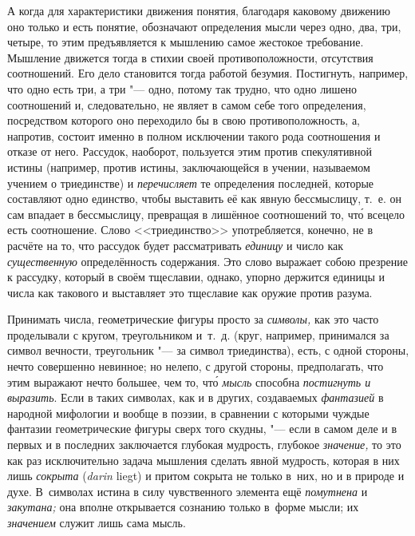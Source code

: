 А когда для характеристики движения понятия, благодаря каковому движению оно
только и есть понятие, обозначают определения мысли через одно, два, три,
четыре, то этим предъявляется к мышлению самое жестокое требование. Мышление
движется тогда в стихии своей противоположности, отсутствия соотношений. Его
дело становится тогда работой безумия. Постигнуть, например, что одно есть три,
а три "--- одно, потому так трудно, что одно лишено соотношений и,
следовательно, не являет в самом себе того определения, посредством которого
оно переходило бы в свою противоположность, а, напротив, состоит именно в
полном исключении такого рода соотношения и отказе от него. Рассудок, наоборот,
пользуется этим против спекулятивной истины (например, против истины,
заключающейся в учении, называемом учением о триединстве) и {\em перечисляет}
те определения последней, которые составляют одно единство, чтобы выставить её
как явную бессмыслицу, т.~е. он сам впадает в бессмыслицу, превращая в лишённое
соотношений то, чт\'{о} всецело есть соотношение. Слово <<триединство>>
употребляется, конечно, не в расчёте на то, что рассудок будет рассматривать
{\em единицу} и число как {\em существенную} определённость содержания. Это слово
выражает собою презрение к рассудку, который в своём тщеславии, однако, упорно
держится единицы и числа как такового и выставляет это тщеславие как оружие
против разума.

Принимать числа, геометрические фигуры просто за {\em символы,} как это часто
проделывали с кругом, треугольником и~т.~д. (круг, например, принимался за
символ вечности, треугольник "--- за символ триединства), есть, с одной
стороны, нечто совершенно невинное; но нелепо, с другой стороны, предполагать,
что этим выражают нечто большее, чем то, чт\'{о} {\em мысль} способна
{\em постигнуть и выразить}. Если в таких символах, как и в других, создаваемых
{\em фантазией} в народной мифологии и вообще в поэзии, в сравнении с которыми
чуждые фантазии геометрические фигуры сверх того скудны, "--- если в самом деле
и в первых и в последних заключается глубокая мудрость, глубокое
{\em значение,} то это как раз исключительно задача мышления сделать явной мудрость,
которая в них лишь {\em сокрыта} ({\em \!darin} liegt) и притом сокрыта не только
в~них, но и в природе и духе. В~символах истина в силу чувственного элемента
ещё {\em помутнена} и {\em закутана;} она вполне открывается сознанию только
в~форме мысли; их {\em значением} служит лишь сама мысль.

